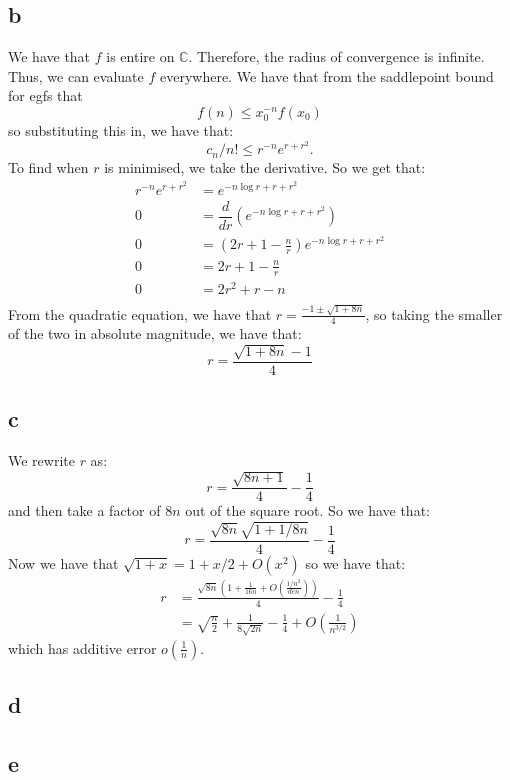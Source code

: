 \documentclass[]{article}
\begin{document}
\subsection{b}
We have that $f$ is entire on $\mathbb{C}$. Therefore, the radius of convergence is infinite. Thus, we can evaluate $f$ everywhere. We have that from the saddlepoint bound for egfs that
\begin{equation}
	[x^n] f(n) \leq x_0^{-n} f(x_0)
\end{equation}
so substituting this in, we have that:
\begin{equation}
	c_n/n! \leq r^{-n} e^{r + r^2}.
\end{equation}
To find when $r$ is minimised, we take the derivative. So we get that:
\begin{align*}
	 r^{-n} e^{r + r^2} &= e^{-n \log r + r + r^2}\\
	 0 &= \dfrac{d}{dr}(e^{-n \log r + r + r^2}) \\
	 0 &= \left(2r + 1 - \frac{n}{r}\right) e^{-n \log r + r + r^2}\\
	 0 &= 2r + 1 - \frac{n}{r}\\
	 0 &= 2r^2 + r - n\\
\end{align*}
From the quadratic equation, we have that $r = \frac{-1 \pm \sqrt{1 + 8n}}{4}$, so taking the smaller of the two in absolute magnitude, we have that:
\begin{equation}
	r = \frac{\sqrt{1 + 8n} - 1}{4}
\end{equation}

\subsection{c}
We rewrite $r$ as:
\begin{equation}
	r = \frac{\sqrt{8n + 1}}{4} - \frac{1}{4}
\end{equation}
and then take a factor of $8n$ out of the square root. So we have that:
\begin{equation}
	r = \frac{\sqrt{8n}\sqrt{1+ 1/8n}}{4} - \frac{1}{4}
\end{equation}
Now we have that $\sqrt{1 + x} = 1 + x/2 + O(x^2)$ so we have that:
\begin{align*}
	r &= \frac{\sqrt{8n}\left(1 + \frac{1}{16n} + O(\frac{1/n^2}{den})\right)}{4} - \frac{1}{4}\\
	&= \sqrt{\frac{n}{2}} + \frac{1}{8 \sqrt{2 n}} - \frac{1}{4} + O(\frac{1}{n^{3/2}})
\end{align*}
which has additive error $o(\frac{1}{n})$. 

\subsection{d}

\subsection{e}
\end{document}
